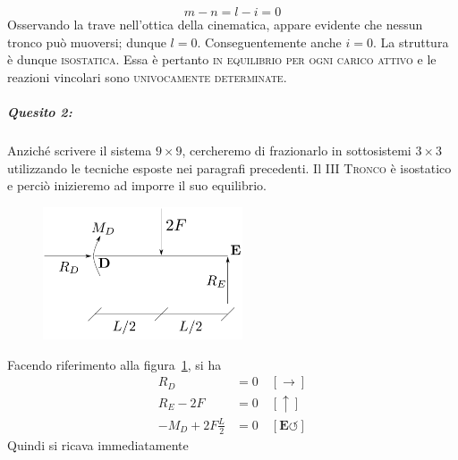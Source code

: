 \begin{equation*}
m-n = l-i = 0
\end{equation*}
Osservando la trave nell'ottica della cinematica, appare evidente che nessun tronco può muoversi; dunque $l=0$. Conseguentemente anche $i=0$. La struttura è dunque \textsc{isostatica}. Essa è pertanto \textsc{in equilibrio per ogni carico attivo} e le reazioni vincolari sono \textsc{univocamente determinate}. 
\noindent \subparagraph{Quesito 2:}
Anziché scrivere il sistema $9\times 9$, cercheremo di frazionarlo in sottosistemi $3\times 3$ utilizzando le tecniche esposte nei paragrafi precedenti. Il \textsc{III Tronco} è isostatico e perciò inizieremo ad imporre il suo equilibrio.
\renewcommand{\thefigure}{8.1~-~2}
\begin{figure}[ht]
\centering
\includegraphics[width=0.525\textwidth]{Immagini/Parte_8/Esercizio8_1/Esercizio8_1_4.pdf}
\caption{}
\label{Esercizio8-1-2}
\end{figure}
Facendo riferimento alla figura~\ref{Esercizio8-1-2}, si ha
\begin{align*}
R_D &= 0 \quad [\to] \\ 
R_E - 2F &= 0 \quad [\uparrow] \\
-M_D + 2F\frac{L}{2} &=0 \quad [\mathbf{E}\circlearrowleft]
\end{align*}
Quindi si ricava immediatamente
